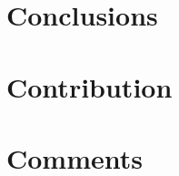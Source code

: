 \documentclass[12pt,twocolumn]{article}
\begin{document}
\section{Conclusions}
    \label{sec:conclusions}
    
\clearpage



\begin{appendices}
\section{Contribution}
    \label{sec:contribution}
    
\section{Comments}
    \label{sec:comments}
    
\end{appendices}

%

\end{document}
